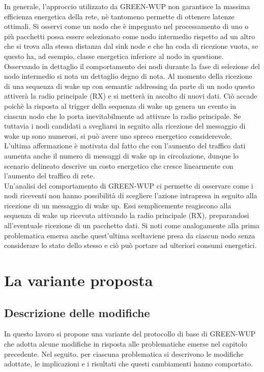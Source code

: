 \documentclass[binding=0.6cm,TFA]{sapthesis}
\begin{document}
In generale, l'approccio utilizzato da GREEN-WUP non garantisce la massima efficienza energetica della rete, nè tantomeno permette di ottenere latenze ottimali.
Si osservi come un nodo che è impegnato nel processamento di uno o più pacchetti possa essere selezionato come nodo intermedio rispetto ad un altro che si
trova alla stessa distanza dal sink node e che ha coda di ricezione vuota, se questo ha, ad esempio, classe energetica inferiore al nodo in questione. \\

Osservando in dettaglio il comportamento dei nodi durante la fase di selezione del nodo intermedio si nota un dettaglio degno di nota.
Al momento della ricezione di una sequenza di wake up con semantic addressing da parte di un nodo questo attiverà la radio principale (RX) e si metterà
in ascolto di nuovi dati. Ciò accade poichè la risposta al trigger della sequenza di wake up genera un evento in ciascun nodo che lo porta
inevitabilmente ad attivare la radio principale. Se tuttavia i nodi candidati a svegliarsi in seguito alla ricezione del messaggio di wake up sono
numerosi, si può avere uno spreco energetico considerevole. L'ultima affermazione è motivata dal fatto che con l'aumento del traffico dati aumenta
anche il numero di messaggi di wake up in circolazione, dunque lo scenario delineato descrive un costo energetico che cresce linearmente con l'aumento
del traffico di rete.\\

Un'analisi del comportamento di GREEN-WUP ci permette di osservare come i nodi riceventi non hanno possibilità di scegliere l'azione
intrapresa in seguito alla ricezione di un messaggio di wake up. Essi semplicemente reagiscono alla sequenza di wake up ricevuta attivando la radio principale (RX),
preparandosi all'eventuale ricezione di un pacchetto dati. Si noti come analogamente alla prima problematica emersa anche quest'ultima sceltaviene presa da
ciascun nodo senza considerare lo stato dello stesso e ciò può portare ad ulteriori consumi energetici.

\chapter{La variante proposta}

\section{Descrizione delle modifiche}

In questo lavoro si propone una variante del protocollo di base di GREEN-WUP che adotta alcune modifiche in risposta alle problematiche emerse nel capitolo
precedente. Nel seguito, per ciascuna problematica si descrivono le modifiche adottate, le implicazioni e i risultati che questi cambiamenti hanno comportato.\\
\end{document}

